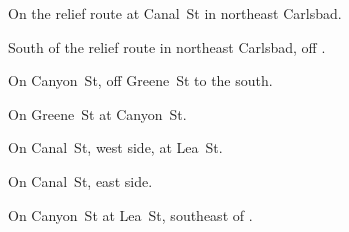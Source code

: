 
\begin{LocationList}

\Location{\GasStation \Gas}
On the relief route at Canal~St in northeast Carlsbad.

South of the relief route in northeast Carlsbad, off .

\Location{\RecruitmentAgency \Recruitment}
On Canyon~St, off  Greene~St to the south.

On  Greene~St at Canyon~St.

\Location{\TruckWash \Rest}
On   Canal~St, west side, at Lea~St.

On  Canal~St, east side.

On Canyon~St at Lea~St, southeast of .

\end{LocationList}
